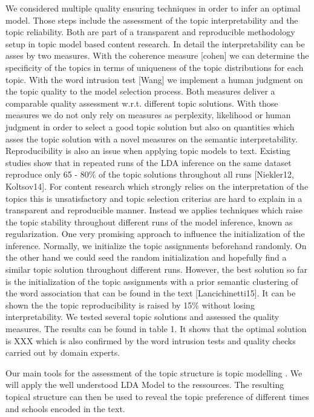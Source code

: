 \documentclass[a4paper,10pt]{article}
\newcommand{\TODO}[1]{\begingroup\color{red}#1\endgroup}
\begin{document}
We considered multiple quality ensuring techniques in
order to infer an optimal model. Those steps include the assessment of the
topic interpretability and the topic reliability. Both are part of a
transparent and reproducible methodology setup in topic model based content
research.  In detail the interpretability can be asses by two
measures. With the coherence measure [cohen] we can determine the
specificity of the topics in terms of uniqueness of the topic distributions
for each topic. With the word intrusion test [Wang] we implement a human
judgment on the topic quality to the model selection process. Both measures
deliver a comparable quality assessment w.r.t. different topic
solutions. With those measures we do not only rely on measures as
perplexity, likelihood or human judgment in order to select a good topic
solution but also on quantities which asses the topic solution with a novel
measures on the semantic interpretability. Reproducibility is also an issue
when applying topic models to text. Existing studies show that in repeated
runs of the LDA inference on the same dataset reproduce only 65 - 80\% of
the topic solutions throughout all runs [Niekler12, Koltsov14]. For content
research which strongly relies on the interpretation of the topics this is
unsatisfactory and topic selection criterias are hard to explain in a
transparent and reproducible manner. Instead we applies techniques which
raise the topic stability throughout different runs of the model inference,
known as regularization. One very promising approach to influence the
initialization of the inference. Normally, we initialize the topic
assignments beforehand randomly. On the other hand we could seed the random
initialization and hopefully find a similar topic solution throughout
different runs. However, the best solution so far is the initialization of
the topic assignments with a prior semantic clustering of the word
association that can be found in the text [Lancichinetti15]. It can be
shown the the topic reproducibility is raised by 15\% without losing
interpretability. We tested several topic solutions and assessed the
quality measures. The results can be found in table 1. It shows that the
optimal solution is XXX which is also confirmed by the word intrusion tests
and quality checks carried out by domain experts.





  Our main tools for the assessment of the topic structure is topic
  modelling .  We will apply the well understood LDA Model to
  the ressources. The resulting topical structure can then be used to
  reveal the topic preference of different times and \TODO{schools} encoded
  in the text.
\end{document}
